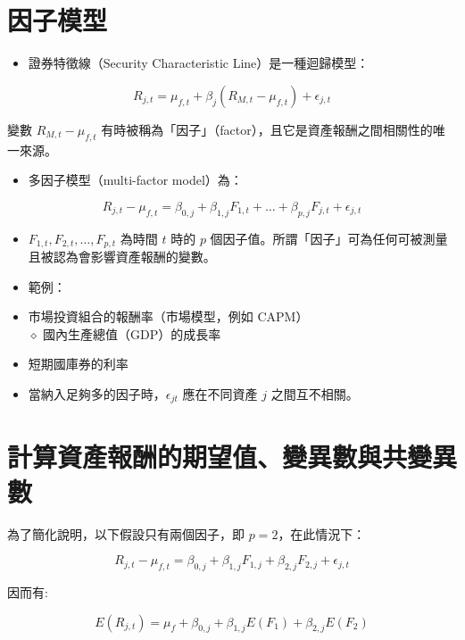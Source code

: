\documentclass[letterpaper]{article}
\begin{document}
\section*{因子模型}
\begin{itemize}
	\item 證券特徵線（Security Characteristic Line）是一種迴歸模型：
\end{itemize}


$$
R_{j, t}=\mu_{f, t}+\beta_{j}\left(R_{M, t}-\mu_{f, t}\right)+\epsilon_{j, t}
$$

變數 $R_{M, t}-\mu_{f, t}$ 有時被稱為「因子」（factor），且它是資產報酬之間相關性的唯一來源。

\begin{itemize}
	\item 多因子模型（multi-factor model）為：
\end{itemize}


$$
R_{j, t}-\mu_{f, t}=\beta_{0, j}+\beta_{1, j} F_{1, t}+\ldots+\beta_{p, j} F_{j, t}+\epsilon_{j, t}
$$

\begin{itemize}
	\item $F_{1, t}, F_{2, t}, \ldots, F_{p, t}$ 為時間 $t$ 時的 $p$ 個因子值。所謂「因子」可為任何可被測量且被認為會影響資產報酬的變數。
\end{itemize}

\begin{itemize}
	\item 範例：
	\item 市場投資組合的報酬率（市場模型，例如 CAPM）\\
	$\diamond$ 國內生產總值（GDP）的成長率
	\item 短期國庫券的利率
	\item 當納入足夠多的因子時，$\epsilon_{j t}$ 應在不同資產 $j$ 之間互不相關。
\end{itemize}

\section*{計算資產報酬的期望值、變異數與共變異數}
為了簡化說明，以下假設只有兩個因子，即 $p=2$，在此情況下：

$$
R_{j, t}-\mu_{f, t}=\beta_{0, j}+\beta_{1, j} F_{1, j}+\beta_{2, j} F_{2, j}+\epsilon_{j, t}
$$

因而有:

$$
E\left(R_{j, t}\right)=\mu_{f}+\beta_{0, j}+\beta_{1, j} E\left(F_{1}\right)+\beta_{2, j} E\left(F_{2}\right)
$$
\end{document}
